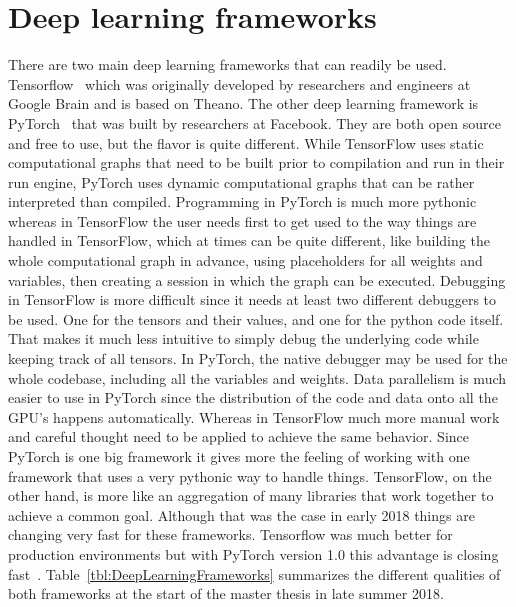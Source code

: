 \section{Deep learning frameworks}

There are two main deep learning frameworks that can readily be used. Tensorflow~\cite{tensorflow} which was originally developed by researchers and engineers at Google Brain and is based on Theano. The other deep learning framework is PyTorch~\cite{pytorch} that was built by researchers at Facebook. They are both open source and free to use, but the flavor is quite different. While TensorFlow uses static computational graphs that need to be built prior to compilation and run in their run engine, PyTorch uses dynamic computational graphs that can be rather interpreted than compiled. Programming in PyTorch is much more pythonic whereas in TensorFlow the user needs first to get used to the way things are handled in TensorFlow, which at times can be quite different, like building the whole computational graph in advance, using placeholders for all weights and variables, then creating a session in which the graph can be executed. Debugging in TensorFlow is more difficult since it needs at least two different debuggers to be used. One for the tensors and their values, and one for the python code itself. That makes it much less intuitive to simply debug the underlying code while keeping track of all tensors. In PyTorch, the native debugger may be used for the whole codebase, including all the variables and weights. Data parallelism is much easier to use in PyTorch since the distribution of the code and data onto all the GPU's happens automatically. Whereas in TensorFlow much more manual work and careful thought need to be applied to achieve the same behavior. Since PyTorch is one big framework it gives more the feeling of working with one framework that uses a very pythonic way to handle things. TensorFlow, on the other hand, is more like an aggregation of many libraries that work together to achieve a common goal. Although that was the case in early 2018 things are changing very fast for these frameworks. Tensorflow was much better for production environments but with PyTorch version 1.0 this advantage is closing fast~\cite{pytorchOnePointZero}. Table~\ref{tbl:DeepLearningFrameworks} summarizes the different qualities of both frameworks at the start of the master thesis in late summer 2018. \\

